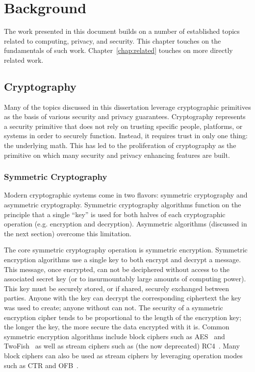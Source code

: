 \chapter{Background}
\label{chap:background}

The work presented in this document builds on a number of established
topics related to computing, privacy, and security. This chapter
touches on the fundamentals of such work. Chapter~\ref{chap:related}
touches on more directly related work.

\section{Cryptography}
\label{chap:background:crypto}

Many of the topics discussed in this dissertation leverage
cryptographic primitives as the basis of various security and privacy
guarantees. Cryptography represents a security primitive that does not
rely on trusting specific people, platforms, or systems in order to
securely function. Instead, it requires trust in only one thing: the
underlying math. This has led to the proliferation of cryptography as
the primitive on which many security and privacy enhancing features
are built.

\subsection{Symmetric Cryptography}

Modern cryptographic systems come in two flavors: symmetric
cryptography and asymmetric cryptography. Symmetric cryptography
algorithms function on the principle that a single ``key'' is used for
both halves of each cryptographic operation (e.g. encryption and
decryption). Asymmetric algorithms (discussed in the next section)
overcome this limitation.

The core symmetric cryptography operation is symmetric
encryption. Symmetric encryption algorithms use a single key to both
encrypt and decrypt a message. This message, once encrypted, can not
be deciphered without access to the associated secret key (or to
insurmountably large amounts of computing power). This key must be
securely stored, or if shared, securely exchanged between
parties. Anyone with the key can decrypt the corresponding ciphertext
the key was used to create; anyone without can not. The security of a
symmetric encryption cipher tends to be proportional to the length of
the encryption key; the longer the key, the more secure the data
encrypted with it is. Common symmetric encryption algorithms include
block ciphers such as AES~\cite{nist2001} and
TwoFish~\cite{schneier1998} as well as stream ciphers such as (the now
deprecated) RC4~\cite{rc4-source}. Many block ciphers can also be used
as stream ciphers by leveraging operation modes such as CTR and
OFB~\cite{schneier2010crypto}.

